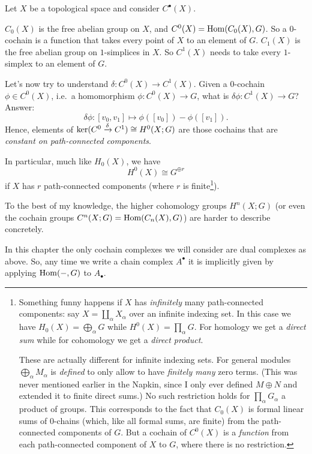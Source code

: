 \begin{example}
	[$C^0(X; G)$, $C^1(X; G)$, and $H^0(X;G)$]
	Let $X$ be a topological space and consider $C^\bullet(X)$.
	\begin{itemize}
		\ii $C_0(X)$ is the free abelian group on $X$,
		and $C^0(X) = \operatorname{Hom}(C_0(X), G)$.
		So a $0$-cochain is a function that
		takes every point of $X$ to an element of $G$.
		\ii $C_1(X)$ is the free abelian group on $1$-simplices in $X$.
		So $C^1(X)$ needs to take every $1$-simplex to an element of $G$.
	\end{itemize}
	Let's now try to understand $\delta : C^0(X) \to C^1(X)$.
	Given a $0$-cochain $\phi \in C^0(X)$,
	i.e.\ a homomorphism $\phi : C^0(X) \to G$,
	what is $\delta\phi : C^1(X) \to G$?
	Answer: 
	\[ \delta\phi : [v_0, v_1] \mapsto \phi([v_0]) - \phi([v_1]). \]
	Hence, elements of 
	$\ker(C^0 \xrightarrow{\delta} C^1) \cong H^0(X;G)$
	are those cochains
	that are \emph{constant on path-connected components}.
\end{example}
In particular, much like $H_0(X)$, we have \[ H^0(X) \cong G^{\oplus r} \]
if $X$ has $r$ path-connected components (where $r$ is finite\footnote{%
	Something funny happens if $X$ has \emph{infinitely} many path-connected components:
	say $X = \coprod_\alpha X_\alpha$ over an infinite indexing set.
	In this case we have
	$H_0(X) = \bigoplus_\alpha G$ while $H^0(X) = \prod_\alpha G$.
	For homology we get a \emph{direct sum} while
	for cohomology we get a \emph{direct product}.

	These are actually different for infinite indexing sets.
	For general modules $\bigoplus_\alpha M_\alpha$ is \emph{defined} to only allow
	to have \emph{finitely many} zero terms.
	(This was never mentioned earlier in the Napkin,
	since I only ever defined $M \oplus N$ and extended it to finite direct sums.)
	No such restriction holds for $\prod_\alpha G_\alpha$ a product of groups.
	This corresponds to the fact that $C_0(X)$ is formal linear sums of $0$-chains
	(which, like all formal sums, are finite)
	from the path-connected components of $G$.
	But a cochain of $C^0(X)$ is a \emph{function}
	from each path-connected component of $X$ to $G$,
	where there is no restriction.
}).

To the best of my knowledge, the higher cohomology groups $H^n(X; G)$
(or even the cochain groups $C^n(X; G) = \operatorname{Hom}(C_n(X), G)$) are harder to describe concretely.

\begin{abuse}
	In this chapter the only cochain complexes
	we will consider are dual complexes as above.
	So, any time we write a chain complex $A^\bullet$ it is implicitly given
	by applying $\operatorname{Hom}(-,G)$ to $A_\bullet$.
\end{abuse}

